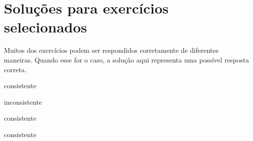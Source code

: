 \chapter[Soluções para exercícios selecionados]{Soluções para exercícios selecionados}
\label{app.solutions}

Muitos dos exercícios podem ser respondidos corretamente de diferentes maneiras. Quando esse for o caso, a solução aqui representa uma possível resposta correta.

\begin{earg}
\item consistente
\item inconsistente
\item consistente
\item consistente
\end{earg}

\nextSeq
\nextSeq
\nextSeq
\noSeq
\noSeq
\nextSeq
\noSeq
\nextSeq
\noSeq
\lastSeq

